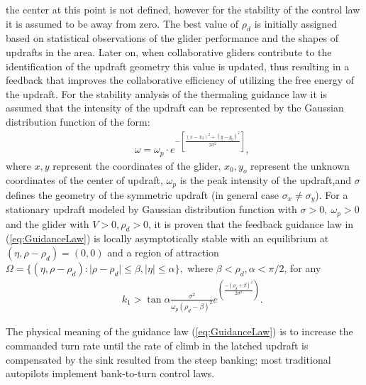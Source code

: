 \documentclass{ifacconf}
\begin{document}
the center at this point is not defined, however for the stability of the
control law it is assumed to be away from zero. The best value of $\rho_d$ is
initially assigned based on statistical observations of the glider
performance and the shapes of updrafts in the area. Later on, when
collaborative gliders contribute to the identification of the updraft
geometry this value is updated, thus resulting in a feedback that improves
the collaborative efficiency of utilizing the free energy of the updraft. For
the stability analysis of the thermaling guidance law it is assumed that the
intensity of the updraft can be represented by the Gaussian distribution
function of the form:
\begin{eqnarray}
    && \omega=\omega_p \cdot e^{-[\frac{(x-x_0)^2+(y-y_0)^2}{2\sigma^2}]},
    \label{eq:GaussUpdraft}
\end{eqnarray}
where $x, y$ represent the coordinates of the glider, $x_0, y_o$ represent
the unknown coordinates of the center of updraft, $\omega_p$ is the peak
intensity of the updraft,and $\sigma$ defines the geometry of the symmetric
updraft (in general case $\sigma_x \neq \sigma_y$). For a stationary updraft
modeled by Gaussian distribution function with $\sigma>0,~\omega_p>0$ and the
glider with $V>0, \rho_d>0$, it is proven that the feedback guidance law in
(\ref{eq:GuidanceLaw}) is locally asymptotically stable with an equilibrium
at $(\eta, \rho-\rho_d)=(0,0)$ and a region of attraction $\Omega=\{(\eta,
\rho-\rho_d): \vert \rho-\rho_d \vert \leq \beta,  \vert \eta \vert \leq
\alpha \}, $ where $\beta < \rho_d, \alpha< \pi/2$, for any
\begin{eqnarray}
    && k_1 > \tan \alpha \frac{\sigma^2}{\omega_p(\rho_d-\beta)^2}
    e^(\frac{-(\rho_d+\beta)^2}{2\sigma^2} ).\nonumber
    \label{eq:GuidanceGain}
\end{eqnarray}

The physical meaning of the guidance law (\ref{eq:GuidanceLaw}) is to
increase the commanded turn rate until the rate of climb in the latched
updraft is compensated by the sink resulted from the steep banking; most
traditional autopilots implement bank-to-turn control laws.
\end{document}
